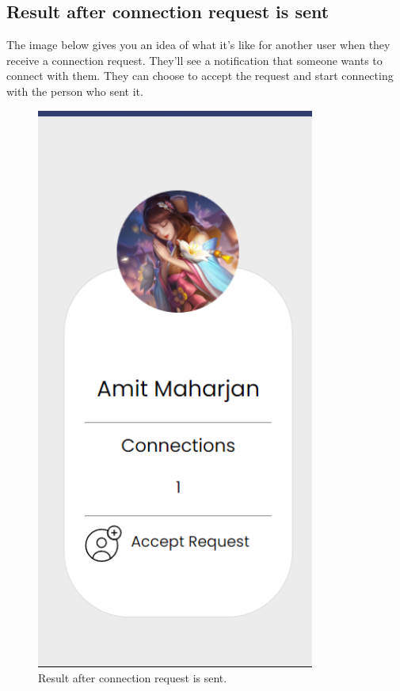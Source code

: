 \subsection{Result after connection request is sent}
The image below gives you an idea of what it's like for another user when they receive a connection request. They'll see a notification that someone wants to connect with them. They can choose to accept the request and start connecting with the person who sent it. 
\begin{figure}[H]
    \centering
    \includegraphics[height=0.3\textheight]{Outcome-ss/accept-request.png}
    \caption{Result after connection request is sent.}
    \label{fig:Result after connection request is sent}
\end{figure}

